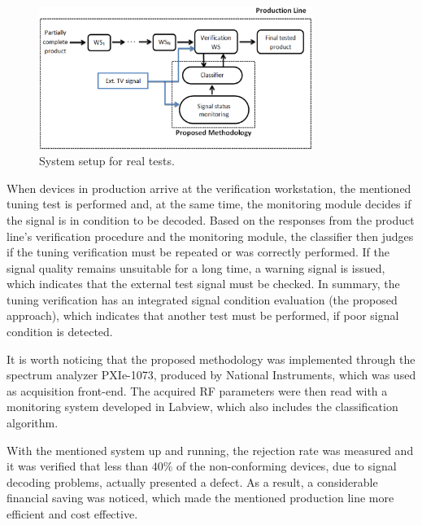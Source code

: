 \documentclass[conference]{IEEEtran}
\begin{document}
\begin{figure}[ht]
\centerline{\includegraphics[width=3.5in]{Fig1.eps}}
\caption{System setup for real tests.}
\label{figure:fig1}
\end{figure}

When devices in production arrive at the verification workstation, the mentioned tuning test is performed and, at the same time, the monitoring module decides if the signal is in condition to be decoded. Based on the responses from the product line's verification procedure and the monitoring module, the classifier then judges if the tuning verification must be repeated or was correctly performed. If the signal quality remains unsuitable for a long time, a warning signal is issued, which indicates that the external test signal must be checked. In summary, the tuning verification has an integrated signal condition evaluation  (the proposed approach), which indicates that another test must be performed, if poor signal condition is detected. 

It is worth noticing that the proposed methodology was implemented through the spectrum analyzer PXIe-1073, produced by National Instruments, which was used as acquisition front-end. The acquired RF parameters were then read with a monitoring system developed in Labview, which also includes the classification algorithm.

With the mentioned system up and running, the rejection rate was measured and it was verified that less than $40\%$ of the non-conforming devices, due to signal decoding problems, actually presented a defect. As a result, a considerable financial saving was noticed, which made the mentioned production line more efficient and cost effective.


%
%
\end{document}
